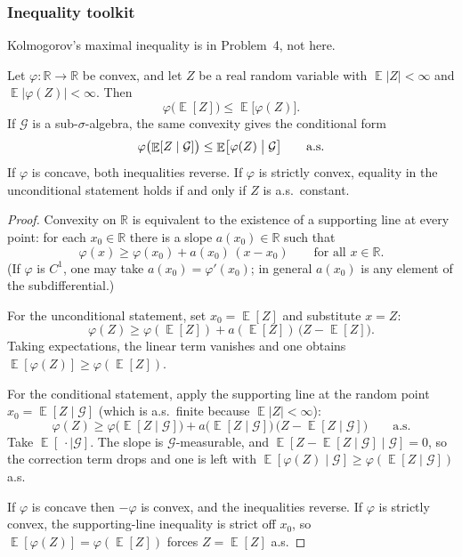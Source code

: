 \documentclass[11pt,a4paper]{article}
\DeclareMathOperator{\E}{\mathbb{E}}
\begin{document}
\subsubsection{Inequality toolkit}

Kolmogorov's maximal inequality is in Problem~4, not here.

\begin{lemma}[Jensen]
\label{lem:p7-jensen}
Let \(\varphi:\mathbb{R}\to\mathbb{R}\) be convex, and let \(Z\) be a real random variable with \(\E\lvert Z\rvert<\infty\) and \(\E\lvert\varphi(Z)\rvert<\infty\). Then
\[
\varphi\bigl(\E[Z]\bigr)
\le
\E\bigl[\varphi(Z)\bigr].
\]
If \(\mathcal{G}\) is a sub-\(\sigma\)-algebra, the same convexity gives the conditional form
\[
\varphi\bigl(\E[Z\mid\mathcal{G}]\bigr)
\le
\E\bigl[\varphi(Z)\bigm|\mathcal{G}\bigr]
\qquad\text{a.s.}
\]
If \(\varphi\) is concave, both inequalities reverse. If \(\varphi\) is strictly convex, equality in the unconditional statement holds if and only if \(Z\) is a.s.\ constant.
\end{lemma}

\begin{proof}
Convexity on \(\mathbb{R}\) is equivalent to the existence of a supporting line at every point: for each \(x_0\in\mathbb{R}\) there is a slope \(a(x_0)\in\mathbb{R}\) such that
\[
\varphi(x)
\ge
\varphi(x_0)+a(x_0)\,(x-x_0)
\qquad\text{for all }x\in\mathbb{R}.
\]
(If \(\varphi\) is \(C^1\), one may take \(a(x_0)=\varphi'(x_0)\); in general \(a(x_0)\) is any element of the subdifferential.)

For the unconditional statement, set \(x_0=\E[Z]\) and substitute \(x=Z\):
\[
\varphi(Z)
\ge
\varphi(\E[Z])+a(\E[Z])\,\bigl(Z-\E[Z]\bigr).
\]
Taking expectations, the linear term vanishes and one obtains \(\E[\varphi(Z)]\ge\varphi(\E[Z])\).

For the conditional statement, apply the supporting line at the random point \(x_0=\E[Z\mid\mathcal{G}]\) (which is a.s.\ finite because \(\E\lvert Z\rvert<\infty\)):
\[
\varphi(Z)
\ge
\varphi\bigl(\E[Z\mid\mathcal{G}]\bigr)
+
a\bigl(\E[Z\mid\mathcal{G}]\bigr)\,
\bigl(Z-\E[Z\mid\mathcal{G}]\bigr)
\qquad\text{a.s.}
\]
Take \(\E[\,\cdot\mid\mathcal{G}]\). The slope is \(\mathcal{G}\)-measurable, and \(\E[Z-\E[Z\mid\mathcal{G}]\mid\mathcal{G}]=0\), so the correction term drops and one is left with \(\E[\varphi(Z)\mid\mathcal{G}]\ge\varphi(\E[Z\mid\mathcal{G}])\) a.s.

If \(\varphi\) is concave then \(-\varphi\) is convex, and the inequalities reverse. If \(\varphi\) is strictly convex, the supporting-line inequality is strict off \(x_0\), so \(\E[\varphi(Z)]=\varphi(\E[Z])\) forces \(Z=\E[Z]\) a.s.
\end{proof}
\end{document}
